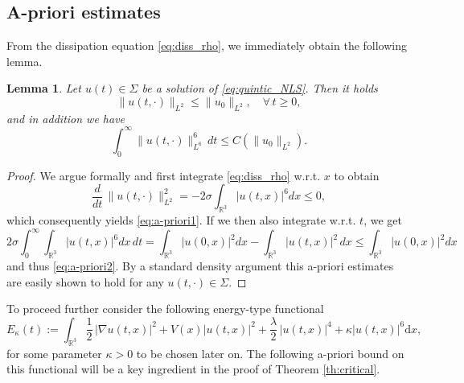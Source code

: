\documentclass[a4paper,leqno]{amsart}
\theoremstyle{plain}
\newtheorem{lemma}[theorem]{Lemma}
\theoremstyle{definition}
\numberwithin{equation}{section}
\begin{document}
\subsection{A-priori estimates}\label{sec:a-priori} From the dissipation equation \eqref{eq:diss_rho}, we immediately obtain
the following lemma.
\begin{lemma}  \label{lem:a-priori}
Let $u(t) \in \Sigma$ be a solution of \eqref{eq:quintic_NLS}. Then it holds
\begin{equation}\label{eq:a-priori1}
\| u(t, \cdot) \|_{L^2} {\leqslant} \| u_0 \|_{L^2},\quad \forall \, t {\geqslant} 0,
\end{equation}
and in addition we have
\begin{equation}\label{eq:a-priori2}
\int _0^\infty \| u(t, \cdot) \|_{L^6}^6\, dt {\leqslant} C (\| u_0 \|_{L^2}) .
\end{equation}
\end{lemma}
\begin{proof} We argue formally and first integrate \eqref{eq:diss_rho} w.r.t. $x$ to obtain
$$
\frac{d}{dt} \, \| u(t, \cdot) \|_{L^2}^2 = - 2 \sigma \int _{{{\mathbb R}}^3} | u(t,x) |^6dx {\leqslant} 0,
$$
which consequently yields \eqref{eq:a-priori1}. If we then also integrate w.r.t. $t$, we get
\begin{equation*}
2\sigma\int_0^\infty \int_{{{\mathbb R}}^3} | u(t,x) |^6 d x\, d t=\int_{{{\mathbb R}}^3} | u(0,x) |^2 d x-
\int_{{{\mathbb R}}^3}| u(t,x) |^2 \, d x{\leqslant} \int_{{{\mathbb R}}^3} | u(0,x) |^2 d x
\end{equation*}
and thus \eqref{eq:a-priori2}. By a standard density argument this a-priori estimates are easily 
shown to hold for any $u(t, \cdot) \in \Sigma$.
\end{proof}

To proceed further consider the following energy-type functional
\begin{equation}\label{eq:diss_NLS_en}
E_\kappa(t):=\int_{{{\mathbb R}}^3}\frac{1}{2}\, |\nabla u(t,x)|^2+ V(x) |u(t,x)|^2 + \frac{\lambda}{2}\, |u(t,x)|^4+\kappa|u(t,x)|^6{\mathrm{d}} x,
\end{equation}
for some parameter $\kappa  >0$ to be chosen later on.
The following a-priori bound on this functional will be a key ingredient in the proof of Theorem \ref{th:critical}.
\end{document}
